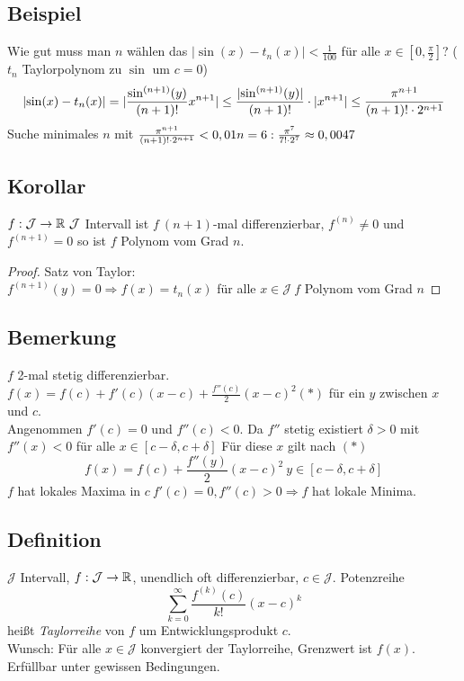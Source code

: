 \subsection{Beispiel}
Wie gut muss man $n$ wählen das $|\sin(x) - t_n(x)| < \frac 1{100}$ für alle $x \in [0,\frac \pi 2]$? ($t_n$ Taylorpolynom zu $\sin$ um $c = 0$)\\
\[\lvert \sin(x) - t_n(x) \rvert = \lvert \frac{\sin^{(n+1)}(y)}{(n+1)!} x^{n+1} \rvert \leq \frac{\lvert \sin^{(n+1)}(y) \rvert }{(n+1)!} \cdot \lvert x^{n+1} \rvert \leq \frac{\pi^{n+1}}{(n+1)! \cdot 2^{n+1}} \]
Suche minimales $n$ mit $\frac{\pi^{n+1}}{(n+1)! \cdot 2^{n+1}} < 0,01\\
n = 6: \frac{\pi^7}{7! \cdot 2^7} \approx 0,0047$\\
\subsection{Korollar}
$f : \mathcal{J} \to \R\ \mathcal{J}$ Intervall ist $f\ (n+1)$-mal differenzierbar, $f^{(n)} \ne 0$ und $f^{(n+1)} = 0$ so ist $f$ Polynom vom Grad $n$.
\begin{proof}
Satz von Taylor:\\
$f^{(n+1)}(y) = 0 \Rightarrow f(x) = t_n(x)$ für alle $x \in \mathcal{J}\ f$ Polynom vom Grad $n$
\end{proof}
\subsection{Bemerkung}
$f$ 2-mal stetig  differenzierbar.\\
$f(x) = f(c) + f'(c)(x-c)  + \frac{f''(c)}{2}(x-c)^2 (\ast)$ für ein $y$ zwischen $x$ und $c$.\\
Angenommen $f'(c) = 0$ und $f''(c) < 0$. Da $f''$ stetig existiert $\delta > 0$ mit $f''(x) < 0$ für alle $x \in [c-\delta, c + \delta]$ Für diese $x$ gilt nach $(\ast)$\\
\[f(x) = f(c) + \frac{f''(y)}{2}(x-c)^2\ y \in [c-\delta,c+\delta] \]
$f$ hat lokales Maxima in $c\ f'(c) = 0, f''(c) > 0 \Rightarrow f$ hat lokale Minima.
\subsection{Definition}
$\mathcal{J}$ Intervall, $f: \mathcal{J} \to \mathbb{R}$, unendlich oft differenzierbar, $c \in \mathcal{J}$. Potenzreihe
\[ \sum\limits_{k=0}^{\infty} \frac{f^{(k)}(c)}{k!}(x-c)^k \]
hei\ss t \emph{Taylorreihe} von $f$ um Entwicklungsprodukt $c$.\\
Wunsch: Für alle $x \in \mathcal{J}$ konvergiert der Taylorreihe, Grenzwert ist $f(x)$.\\
Erfüllbar unter gewissen Bedingungen.
